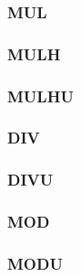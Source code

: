 \subsubsection{MUL }\label{sec:MUL}

\subsubsection{MULH }\label{sec:MULH}

\subsubsection{MULHU }\label{sec:MULHU}

\subsubsection{DIV }\label{sec:DIV}

\subsubsection{DIVU }\label{sec:DIVU}

\subsubsection{MOD }\label{sec:MOD}

\subsubsection{MODU }\label{sec:MODU}